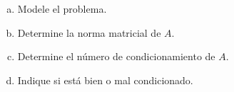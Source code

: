 \documentclass[
	spanish,
	8pt,
	utf8,
	xcolor=table,
	handout,
	aspectratio=169,
	professionalfonts,
	notheorems,
	mathserif,
]{beamer}
\newcounter{savedenum}
\newcommand*{\saveenum}{\setcounter{savedenum}{\theenumi}}
\begin{document}
\begin{frame}
\begin{enumerate}
		      \begin{multicols}{2}
			      \begin{enumerate}[a)]

				      \item

				            Modele el problema.

				      \item

				            Determine la norma matricial de $A$.


				      \item

				            Determine el número de condicionamiento de $A$.

				      \item

				            Indique si está bien o mal condicionado.
			      \end{enumerate}
		      \end{multicols}
		      \saveenum
	\end{enumerate}
\end{frame}
\end{document}
